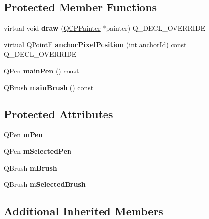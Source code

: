 \subsection*{Protected Member Functions}
\begin{DoxyCompactItemize}
\item 
\mbox{\label{classQCPItemRect_a3c492960d0fc038cf1b60578b62b6cdc}} 
virtual void {\bfseries draw} (\hyperlink{classQCPPainter}{Q\+C\+P\+Painter} $\ast$painter) Q\+\_\+\+D\+E\+C\+L\+\_\+\+O\+V\+E\+R\+R\+I\+DE
\item 
\mbox{\label{classQCPItemRect_a844027325b33a3b7eef424128ee5109c}} 
virtual Q\+PointF {\bfseries anchor\+Pixel\+Position} (int anchor\+Id) const Q\+\_\+\+D\+E\+C\+L\+\_\+\+O\+V\+E\+R\+R\+I\+DE
\item 
\mbox{\label{classQCPItemRect_af94d87da501e9429c0e874f1c0369b03}} 
Q\+Pen {\bfseries main\+Pen} () const
\item 
\mbox{\label{classQCPItemRect_a8813d2d670835ac9b8000c981b8ea6fe}} 
Q\+Brush {\bfseries main\+Brush} () const
\end{DoxyCompactItemize}
\subsection*{Protected Attributes}
\begin{DoxyCompactItemize}
\item 
\mbox{\label{classQCPItemRect_aa0d49323628d6752026056bfb52afd86}} 
Q\+Pen {\bfseries m\+Pen}
\item 
\mbox{\label{classQCPItemRect_a73cc0bee61de3c67221ec8c7a76a29ed}} 
Q\+Pen {\bfseries m\+Selected\+Pen}
\item 
\mbox{\label{classQCPItemRect_a2d7f207fada27588b3a52b19234d3c2e}} 
Q\+Brush {\bfseries m\+Brush}
\item 
\mbox{\label{classQCPItemRect_a21b70eee59b6e19ae0bbdf037b13508f}} 
Q\+Brush {\bfseries m\+Selected\+Brush}
\end{DoxyCompactItemize}
\subsection*{Additional Inherited Members}


